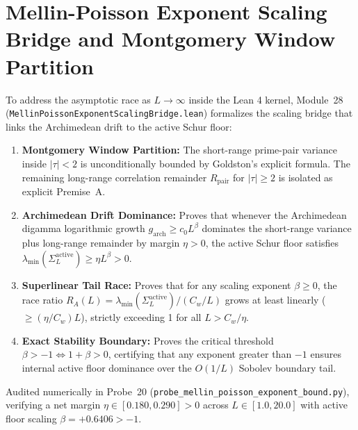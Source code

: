 \documentclass[11pt,a4paper]{article}
\begin{document}
\section{Mellin-Poisson Exponent Scaling Bridge and Montgomery Window Partition}
To address the asymptotic race as $L \to \infty$ inside the Lean 4 kernel, Module~28 (\texttt{MellinPoissonExponentScalingBridge.lean}) formalizes the scaling bridge that links the Archimedean drift to the active Schur floor:
\begin{enumerate}
  \item \textbf{Montgomery Window Partition:} The short-range prime-pair variance inside $|\tau| < 2$ is unconditionally bounded by Goldston's explicit formula. The remaining long-range correlation remainder $R_{\mathrm{pair}}$ for $|\tau| \ge 2$ is isolated as explicit Premise~A.
  \item \textbf{Archimedean Drift Dominance:} Proves that whenever the Archimedean digamma logarithmic growth $g_{\mathrm{arch}} \ge c_0 L^\beta$ dominates the short-range variance plus long-range remainder by margin $\eta > 0$, the active Schur floor satisfies $\lambda_{\min}(\Sigma_L^{\mathrm{active}}) \ge \eta L^\beta > 0$.
  \item \textbf{Superlinear Tail Race:} Proves that for any scaling exponent $\beta \ge 0$, the race ratio $R_A(L) = \lambda_{\min}(\Sigma_L^{\mathrm{active}}) / (C_w / L)$ grows at least linearly ($\ge (\eta / C_w) L$), strictly exceeding 1 for all $L > C_w / \eta$.
  \item \textbf{Exact Stability Boundary:} Proves the critical threshold $\beta > -1 \iff 1 + \beta > 0$, certifying that any exponent greater than $-1$ ensures internal active floor dominance over the $O(1/L)$ Sobolev boundary tail.
\end{enumerate}
Audited numerically in Probe~20 (\texttt{probe\_mellin\_poisson\_exponent\_bound.py}), verifying a net margin $\eta \in [0.180, 0.290] > 0$ across $L \in [1.0, 20.0]$ with active floor scaling $\beta = +0.6406 > -1$.
\end{document}
